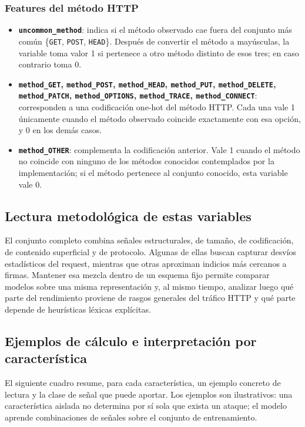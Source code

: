 \documentclass[12pt,oneside]{report}
\begin{document}
\subsubsection{Features del método HTTP}
\begin{itemize}[leftmargin=*]
  \item \textbf{\texttt{uncommon\_method}}: indica si el método observado cae fuera del conjunto más común \{\texttt{GET}, \texttt{POST}, \texttt{HEAD}\}. Después de convertir el método a mayúsculas, la variable toma valor 1 si pertenece a otro método distinto de esos tres; en caso contrario toma 0.

  \item \textbf{\texttt{method\_GET}, \texttt{method\_POST}, \texttt{method\_HEAD}, \texttt{method\_PUT}, \texttt{method\_DELETE}, \texttt{method\_PATCH}, \texttt{method\_OPTIONS}, \texttt{method\_TRACE}, \texttt{method\_CONNECT}}: corresponden a una codificación one-hot del método HTTP. Cada una vale 1 únicamente cuando el método observado coincide exactamente con esa opción, y 0 en los demás casos.

  \item \textbf{\texttt{method\_OTHER}}: complementa la codificación anterior. Vale 1 cuando el método no coincide con ninguno de los métodos conocidos contemplados por la implementación; si el método pertenece al conjunto conocido, esta variable vale 0.
\end{itemize}

\subsection{Lectura metodológica de estas variables}
El conjunto completo combina señales estructurales, de tamaño, de codificación, de contenido superficial y de protocolo. Algunas de ellas buscan capturar desvíos estadísticos del request, mientras que otras aproximan indicios más cercanos a firmas. Mantener esa mezcla dentro de un esquema fijo permite comparar modelos sobre una misma representación y, al mismo tiempo, analizar luego qué parte del rendimiento proviene de rasgos generales del tráfico HTTP y qué parte depende de heurísticas léxicas explícitas.

\subsection{Ejemplos de cálculo e interpretación por característica}
El siguiente cuadro resume, para cada característica, un ejemplo concreto de lectura y la clase de señal que puede aportar. Los ejemplos son ilustrativos: una característica aislada no determina por sí sola que exista un ataque; el modelo aprende combinaciones de señales sobre el conjunto de entrenamiento.
\end{document}
